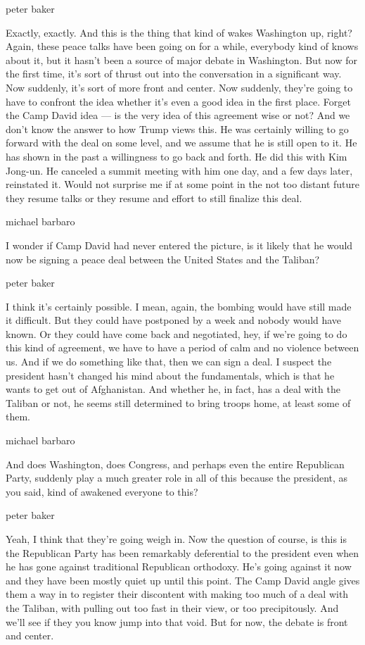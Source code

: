 peter baker

Exactly, exactly. And this is the thing that kind of wakes Washington
up, right? Again, these peace talks have been going on for a while,
everybody kind of knows about it, but it hasn't been a source of major
debate in Washington. But now for the first time, it's sort of thrust
out into the conversation in a significant way. Now suddenly, it's sort
of more front and center. Now suddenly, they're going to have to
confront the idea whether it's even a good idea in the first place.
Forget the Camp David idea --- is the very idea of this agreement wise
or not? And we don't know the answer to how Trump views this. He was
certainly willing to go forward with the deal on some level, and we
assume that he is still open to it. He has shown in the past a
willingness to go back and forth. He did this with Kim Jong-un. He
canceled a summit meeting with him one day, and a few days later,
reinstated it. Would not surprise me if at some point in the not too
distant future they resume talks or they resume and effort to still
finalize this deal.

michael barbaro

I wonder if Camp David had never entered the picture, is it likely that
he would now be signing a peace deal between the United States and the
Taliban?

peter baker

I think it's certainly possible. I mean, again, the bombing would have
still made it difficult. But they could have postponed by a week and
nobody would have known. Or they could have come back and negotiated,
hey, if we're going to do this kind of agreement, we have to have a
period of calm and no violence between us. And if we do something like
that, then we can sign a deal. I suspect the president hasn't changed
his mind about the fundamentals, which is that he wants to get out of
Afghanistan. And whether he, in fact, has a deal with the Taliban or
not, he seems still determined to bring troops home, at least some of
them.

michael barbaro

And does Washington, does Congress, and perhaps even the entire
Republican Party, suddenly play a much greater role in all of this
because the president, as you said, kind of awakened everyone to this?

peter baker

Yeah, I think that they're going weigh in. Now the question of course,
is this is the Republican Party has been remarkably deferential to the
president even when he has gone against traditional Republican
orthodoxy. He's going against it now and they have been mostly quiet up
until this point. The Camp David angle gives them a way in to register
their discontent with making too much of a deal with the Taliban, with
pulling out too fast in their view, or too precipitously. And we'll see
if they you know jump into that void. But for now, the debate is front
and center.

